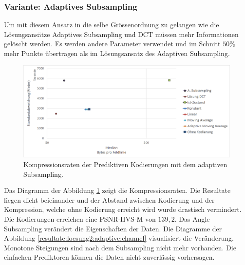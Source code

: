 \subsubsection{Variante: Adaptives Subsampling}
Um mit diesem Ansatz in die selbe Grössenordnung zu gelangen wie die Lösungsansätze Adaptives Subsampling und DCT müssen mehr Informationen gelöscht werden. Es werden andere Parameter verwendet und im Schnitt $50\%$ mehr Punkte übertragen als im Lösungsansatz des Adaptiven Subsampling.\\
\begin{figure}[!htbp]
	\center
	\includegraphics[width=1\textwidth,keepaspectratio]{./pictures/resultate/loesung2/variante1/resultate_euler.png}
	\caption{Kompressionsraten der Prediktiven Kodierungen mit dem adaptiven Subsampling.}
	\label{resultate:loesung2:adaptive:euler}
\end{figure}
Das Diagramm der Abbildung \ref{resultate:loesung2:adaptive:euler} zeigt die Kompressionsraten. Die Resultate liegen dicht beieinander und der Abstand zwischen Kodierung und der Kompression, welche ohne Kodierung erreicht wird wurde drastisch vermindert. Die Kodierungen erreichen eine PSNR-HVS-M von $139,2$. Das Angle Subsampling verändert die Eigenschaften der Daten. Die Diagramme der Abbildung \ref{resultate:loesung2:adaptive:channel} visualisiert die Veränderung. Monotone Steigungen sind nach dem Subsampling nicht mehr vorhanden. Die einfachen Prediktoren können die Daten nicht zuverlässig vorhersagen. 
